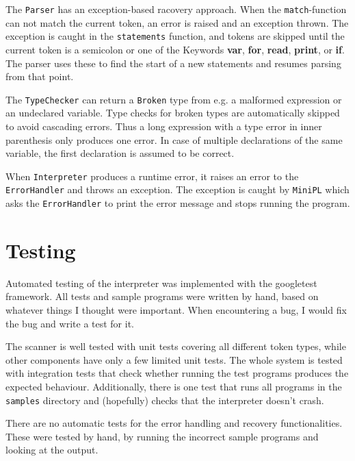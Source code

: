 \documentclass[a4paper]{article}
\newcommand*{\code}[1]{\texttt{#1}}
\begin{document}
The \code{Parser} has an exception-based racovery approach. When the 
\code{match}-function can not match the current token, an error 
is raised and an exception thrown. The exception is caught 
in the \code{statements} function, and tokens are skipped until
the current token is a semicolon or one of the Keywords 
\textbf{var}, \textbf{for}, \textbf{read}, \textbf{print}, 
or \textbf{if}. The parser uses these to find the start of a 
new statements and resumes parsing from that point.


The \code{TypeChecker} can return a \code{Broken} type from e.g.
a malformed expression or an undeclared variable. Type checks 
for broken types are automatically skipped to avoid cascading 
errors. Thus a long expression with a type error in inner 
parenthesis only produces one error. In case of multiple 
declarations of the same variable, the first declaration is 
assumed to be correct.

When \code{Interpreter} produces a runtime error, it 
raises an error to the \code{ErrorHandler} and throws an exception. 
The exception is caught by \code{MiniPL} which asks the 
\code{ErrorHandler} to print the error message and stops running the 
program.

\section{Testing}

Automated testing of the interpreter was implemented with the 
googletest framework. All tests and sample programs were written 
by hand, based on whatever 
things I thought were important. When encountering a bug, I would 
fix the bug and write a test for it. 


The scanner is well tested with unit tests 
covering all different token types, while other components have 
only a few limited unit tests. The whole system is tested with 
integration tests that check whether running the test programs 
produces the expected behaviour. Additionally, there is one 
test that runs all programs in the \code{samples} directory 
and (hopefully) checks that the interpreter doesn't crash.

There are no automatic tests for the error handling and recovery 
functionalities. These were tested by hand, by running the incorrect 
sample programs and looking at the output.
\clearpage
\appendix
  
\newcommand{\pdfappendix}[2]{%

}


\end{document}
